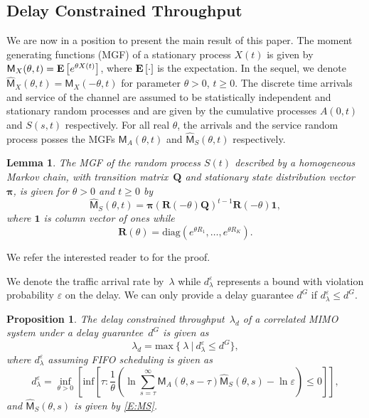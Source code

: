 \documentclass[10pt,conference]{IEEEtran}
\newtheorem{lemma}[theorem]{Lemma}
\newtheorem{proposition}[theorem]{Proposition}
\newcommand{\Ex}{\mathop{\bf E\/}}
\newcommand{\rate}{R}
\begin{document}
\subsection{Delay Constrained Throughput}
We are now in a position to present the main result of this paper.
The moment generating functions (MGF) of a stationary process $X(t)$ is given by $\mathsf{M}_X(\theta,t) = \Ex \left[e^{\theta X(t)}\right]$, where $\Ex \left[\cdot\right]$ is the expectation.
In the sequel, we denote
$\widehat{\mathsf{M}}_X(\theta,t) = \mathsf{M}_X(-\theta,t)$ for parameter $\theta > 0$, $t \geq 0$.
The discrete time arrivals and service of the channel are assumed to be statistically independent and stationary random processes and are given by the cumulative processes $A(0,t)$ and $S(s,t)$ respectively.
For all real $\theta$, the arrivals and the service random process posses the MGFs $\mathsf{M}_A(\theta,t)$ and $\widehat{\mathsf{M}}_S(\theta,t)$ respectively.
\begin{lemma}\label{Lema:MGF_s}
The MGF of the random process $S(t)$ described by a homogeneous Markov chain, with transition matrix~$\mathbf{Q}$ and stationary state distribution vector~$\boldsymbol{\pi}$, is given for $\theta > 0$ and $t \geq 0$ by
\begin{equation}
\label{E:MS}
\widehat{\mathsf{M}}_S(\theta,t) = \boldsymbol{\pi} (\mathbf{R}(-\theta)\mathbf{Q})^{t-1}\mathbf{R}(-\theta)\mathbf{1} ,
\end{equation}
where $\mathbf{1}$ is column vector of ones while
\begin{equation}
	 \mathbf{R}(\theta) = \mathrm{diag}(e^{\theta \rate_1},\dots,e^{\theta \rate_K}) .
\end{equation}
\end{lemma}
\begin{IEEEproof}
We refer the interested reader to \cite{NetCal:Chang00:PerGuaran:Bk} for the proof.
\end{IEEEproof}
We denote the traffic arrival rate by~$\lambda$ while $d^{\varepsilon}_{\lambda}$ represents a bound with violation probability $\varepsilon$ on the delay.
We can only provide a delay guarantee $d^G$ if $d^{\varepsilon}_{\lambda}\!\leq\!d^G$.
\begin{proposition}
The delay constrained throughput~$\lambda_d$ of a correlated MIMO system under a delay guarantee~$d^G$ is given as
\begin{equation}
\label{E:th}
\lambda_d =\mathrm{max}~\{~\lambda ~ \vert ~ d^{\varepsilon}_{\lambda}\leq d^G \}  ,
\end{equation}
where $d^{\varepsilon}_{\lambda}$ assuming FIFO scheduling is given as
\begin{equation}
\label{E:DelayBoundtwice}
\underset{\,}{d^{\varepsilon}_{\lambda}\!=\! \inf_{\theta > 0} \! \left [ \! \mathrm{inf} \! \left [ \! \tau :  \frac{1}{\theta}  \left ( \! \ln \! \sum_{s=\tau}^{\infty} \! \mathsf{M}_A(\theta,s- \tau) \widehat{\mathsf{M}}_S(\theta,s) \! - \! \ln \varepsilon \right ) \leq 0 \! \right ] \! \right ]  ,}
\end{equation}
and $\widehat{\mathsf{M}}_S(\theta,s)$ is given by \eqref{E:MS}.
\end{proposition}
\end{document}
